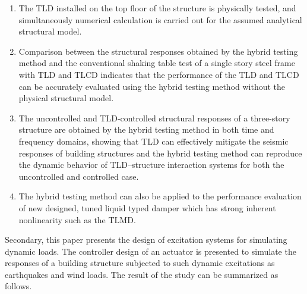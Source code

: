 \begin{enumerate}
\item The TLD installed on the top floor of the structure is physically tested, and simultaneously numerical calculation is carried out for the assumed analytical structural model.
\item Comparison between the structural responses obtained by the hybrid testing method and the conventional shaking table test of a single story steel frame with TLD and TLCD indicates that the performance of the TLD and TLCD can be accurately evaluated using the hybrid testing method without the physical structural model.
\item The uncontrolled and TLD-controlled structural responses of a three-story structure are obtained by the hybrid testing method in both time and frequency domains, showing that TLD can effectively mitigate the seismic responses of building structures and the hybrid testing method can reproduce the dynamic behavior of TLD–structure interaction systems for both the uncontrolled and controlled case.
\item The hybrid testing method can also be applied to the performance evaluation of new designed, tuned liquid typed damper which has strong inherent nonlinearity such as the TLMD.
\end{enumerate}

Secondary, this paper presents the design of excitation systems for simulating dynamic loads. The controller design of an actuator is presented to simulate the responses of a building structure subjected to such dynamic excitations as earthquakes and wind loads. The result of the study can be summarized as follows.  

